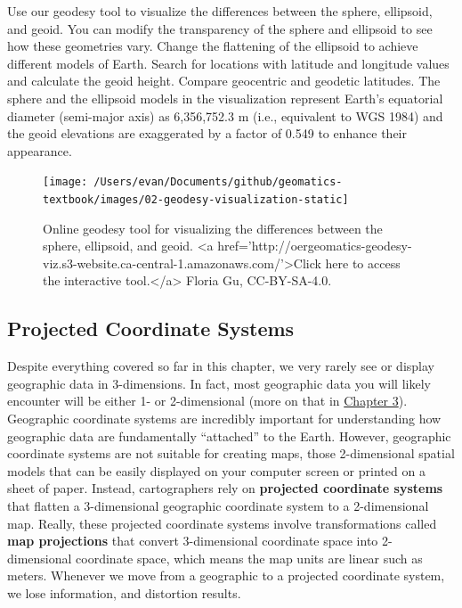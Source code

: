 \documentclass[
]{book}
\begin{document}
Use our geodesy tool to visualize the differences between the sphere, ellipsoid, and geoid. You can modify the transparency of the sphere and ellipsoid to see how these geometries vary. Change the flattening of the ellipsoid to achieve different models of Earth. Search for locations with latitude and longitude values and calculate the geoid height. Compare geocentric and geodetic latitudes. The sphere and the ellipsoid models in the visualization represent Earth's equatorial diameter (semi-major axis) as 6,356,752.3 m (i.e., equivalent to WGS 1984) and the geoid elevations are exaggerated by a factor of 0.549 to enhance their appearance.

\begin{figure}
\texttt{[image: /Users/evan/Documents/github/geomatics-textbook/images/02-geodesy-visualization-static]} \caption{Online geodesy tool for visualizing the differences between the sphere, ellipsoid, and geoid. <a href='http://oergeomatics-geodesy-viz.s3-website.ca-central-1.amazonaws.com/'>Click here to access the interactive tool.</a> Floria Gu, CC-BY-SA-4.0.}\label{fig:2-geodesy-visualization-static}
\end{figure}

\hypertarget{projected-coordinate-systems}{%
\subsection{Projected Coordinate Systems}\label{projected-coordinate-systems}}

Despite everything covered so far in this chapter, we very rarely see or display geographic data in 3-dimensions. In fact, most geographic data you will likely encounter will be either 1- or 2-dimensional (more on that in \href{https://ubc-geomatics-textbook.github.io/geomatics-textbook/types-of-data.html}{Chapter 3}). Geographic coordinate systems are incredibly important for understanding how geographic data are fundamentally ``attached'' to the Earth. However, geographic coordinate systems are not suitable for creating maps, those 2-dimensional spatial models that can be easily displayed on your computer screen or printed on a sheet of paper. Instead, cartographers rely on \textbf{projected coordinate systems} that flatten a 3-dimensional geographic coordinate system to a 2-dimensional map. Really, these projected coordinate systems involve transformations called \textbf{map projections} that convert 3-dimensional coordinate space into 2-dimensional coordinate space, which means the map units are linear such as meters. Whenever we move from a geographic to a projected coordinate system, we lose information, and distortion results.
\end{document}

